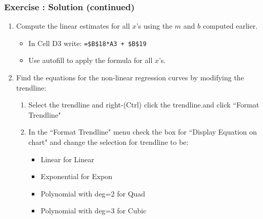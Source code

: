 \documentclass[12pt]{beamer}
\begin{document}
	\begin{frame}
		\frametitle{Exercise : Solution (continued)}
		\begin{enumerate}
			\item Compute the linear estimates for all $x$'s using the $m$ and $b$ computed earlier. 
			\begin{itemize}
				\item In Cell D3 write: \texttt{=\$B\$18*A3 + \$B\$19}
				\item Use autofill to apply the formula for all $x$'s.
			\end{itemize}
			\item Find the equations for the non-linear regression curves by modifying the trendline:
			\begin{enumerate}
				\item Select the trendline and right-(Ctrl) click the trendline.and click ``Format Trendline"
				\item In the ``Format Trendline" menu check the box for ``Display Equation on chart" and change the selection for trendline to be:\begin{itemize}
					\item Linear for Linear 
					\item Exponential for Expon
					\item Polynomial with deg=2 for Quad 
					\item Polynomial with deg=3 for Cubic
				\end{itemize}
			\end{enumerate}
		\end{enumerate}
	\end{frame}
\end{document}
